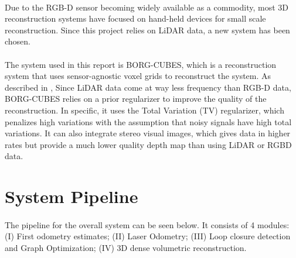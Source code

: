 \documentclass[12pt]{article}
\begin{document}
	\paragraph{}
	Due to the RGB-D sensor becoming widely available as a commodity, most 3D reconstruction systems have focused on hand-held devices for small scale reconstruction. Since this project relies on LiDAR data, a new system has been chosen.	
	
	\paragraph{}
	The system used in this report is BORG-CUBES, which is a reconstruction system that uses sensor-agnostic voxel grids to reconstruct the system. As described in \cite{TannerArXiv2016}, Since LiDAR data come at way less frequency than RGB-D data, BORG-CUBES relies on a prior regularizer to improve the quality of the reconstruction. In specific, it uses the Total Variation (TV) regularizer, which penalizes high variations with the assumption that noisy signals have high total variations. It can also integrate stereo visual images, which gives data in higher rates but provide a much lower quality depth map than using LiDAR or RGBD data.	

	\newpage
	\section{System Pipeline} \label{pipeline}
	\paragraph{}
	The pipeline for the overall system can be seen below. It consists of 4 modules: (I) First odometry estimates; (II) Laser Odometry; (III) Loop closure detection and Graph Optimization; (IV) 3D dense volumetric reconstruction.
\end{document}
